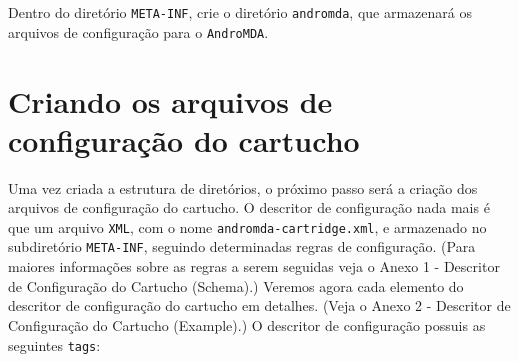 Dentro do diretório \texttt{META-INF}, crie o diretório \texttt{andromda}, que
armazenará os arquivos de configuração para o \texttt{AndroMDA}.

\section{Criando os arquivos de configuração do cartucho}
Uma vez criada a estrutura de diretórios, o próximo passo será a criação dos
arquivos de configuração do cartucho. O descritor de configuração
nada mais é que um arquivo \texttt{XML}, com o nome \texttt{andromda-cartridge.xml}, e
armazenado no subdiretório \texttt{META-INF},  seguindo determinadas regras de
configuração. (Para maiores informações sobre as regras a serem seguidas veja o
Anexo 1 - Descritor de Configuração do Cartucho (Schema).) Veremos agora cada
elemento do descritor de configuração do cartucho em detalhes. (Veja o Anexo 2 -
Descritor de Configuração do Cartucho (Example).) O descritor de configuração
possuis as seguintes \texttt{tags}:

